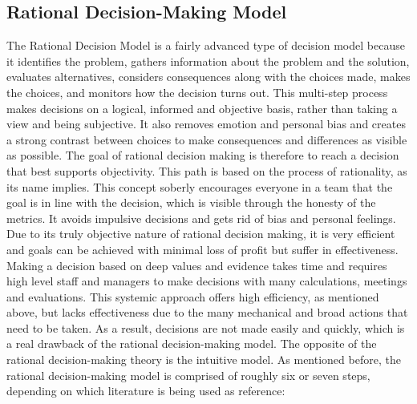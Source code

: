 \subsection{Rational Decision-Making Model}
The Rational Decision Model is a fairly advanced type of decision model because it identifies the problem, gathers information about the problem and the solution, evaluates alternatives, considers consequences along with the choices made, makes the choices, and monitors how the decision turns out. 
This multi-step process makes decisions on a logical, informed and objective basis, rather than taking a view and being subjective. It also removes emotion and personal bias and creates a strong contrast between choices to make consequences and differences as visible as possible.
\newline \noindent The goal of rational decision making is therefore to reach a decision that best supports objectivity. This path is based on the process of rationality, as its name implies. This concept soberly encourages everyone in a team that the goal is in line with the decision, which is visible through the honesty of the metrics. It avoids impulsive decisions and gets rid of bias and personal feelings.
\newline \noindent Due to its truly objective nature of rational decision making, it is very efficient and goals can be achieved with minimal loss of profit but suffer in effectiveness. Making a decision based on deep values and evidence takes time and requires high level staff and managers to make decisions with many calculations, meetings and evaluations. This systemic approach offers high efficiency, as mentioned above, but lacks effectiveness due to the many mechanical and broad actions that need to be taken. As a result, decisions are not made easily and quickly, which is a real drawback of the rational decision-making model. The opposite of the rational decision-making theory is the intuitive model.
\newline \noindent As mentioned before, the rational decision-making model is comprised of roughly six or seven steps, depending on which literature is being used as reference: 

